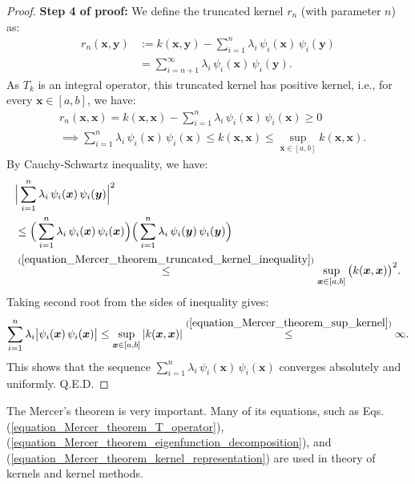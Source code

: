 \documentclass[lang=cn,10pt]{gorgeousnbook}
\numberwithin{equation}{section}%
\numberwithin{figure}{section}%
\begin{document}
\begin{proof}
\textbf{Step 4 of proof:} 
We define the truncated kernel $r_n$ (with parameter $n$) as:
\begin{align}
r_n(\boldsymbol{x}, \boldsymbol{y}) &:= k(\boldsymbol{x}, \boldsymbol{y}) - \sum_{i=1}^n \lambda_i\, \psi_i(\boldsymbol{x})\, \psi_i(\boldsymbol{y}) \nonumber \\
&= \sum_{i={n+1}}^\infty \lambda_i\, \psi_i(\boldsymbol{x})\, \psi_i(\boldsymbol{y}).
\end{align}
As $T_k$ is an integral operator, this truncated kernel has positive kernel, i.e., for every $\boldsymbol{x} \in [a,b]$, we have:
\begin{align}
&r_n(\boldsymbol{x}, \boldsymbol{x}) = k(\boldsymbol{x}, \boldsymbol{x}) - \sum_{i=1}^n \lambda_i\, \psi_i(\boldsymbol{x})\, \psi_i(\boldsymbol{x}) \geq 0 \nonumber \\
&\implies \sum_{i=1}^n \lambda_i\, \psi_i(\boldsymbol{x})\, \psi_i(\boldsymbol{x}) \leq k(\boldsymbol{x}, \boldsymbol{x}) \leq \sup_{\boldsymbol{x} \in [a,b]} k(\boldsymbol{x}, \boldsymbol{x}). \label{equation_Mercer_theorem_truncated_kernel_inequality}
\end{align}
By Cauchy-Schwartz inequality, we have:
\begin{align*}
&\Big|\sum_{i=1}^n \lambda_i\, \psi_i(\boldsymbol{x})\, \psi_i(\boldsymbol{y})\Big|^2 \\
&\leq \Big( \sum_{i=1}^n \lambda_i\, \psi_i(\boldsymbol{x})\, \psi_i(\boldsymbol{x}) \Big) \Big( \sum_{i=1}^n \lambda_i\, \psi_i(\boldsymbol{y})\, \psi_i(\boldsymbol{y}) \Big) \\
&\overset{(\ref{equation_Mercer_theorem_truncated_kernel_inequality})}{\leq} \sup_{\boldsymbol{x} \in [a,b]} \big(k(\boldsymbol{x}, \boldsymbol{x})\big)^2.
\end{align*}
Taking second root from the sides of inequality gives:
\begin{align}
\sum_{i=1}^n \lambda_i \big|\psi_i(\boldsymbol{x})\, \psi_i(\boldsymbol{x})\big| \leq \sup_{\boldsymbol{x} \in [a,b]} | k(\boldsymbol{x}, \boldsymbol{x}) | \overset{(\ref{equation_Mercer_theorem_sup_kernel})}{\leq} \infty.
\end{align}
This shows that the sequence $\sum_{i=1}^n \lambda_i\, \psi_i(\boldsymbol{x})\, \psi_i(\boldsymbol{x})$ converges absolutely and uniformly.
Q.E.D.
\end{proof}

The Mercer's theorem is very important. Many of its equations, such as Eqs. (\ref{equation_Mercer_theorem_T_operator}), (\ref{equation_Mercer_theorem_eigenfunction_decomposition}), and (\ref{equation_Mercer_theorem_kernel_representation}) are used in theory of kernels and kernel methods. 
\end{document}
